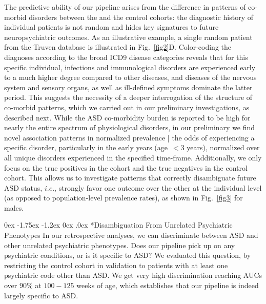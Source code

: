 \documentclass[onecolumn, compsoc,11pt]{IEEEtran}
\makeatletter
\renewcommand\subsection{\@startsection {subsection}{2}{\z@}%
                                   {0ex \@plus -1.75ex \@minus -1.2ex}%
                                   {0ex \@plus.0ex}%
                                   {\fontsize{11}{11}\selectfont\bfseries\sffamily\color{black}}}
\makeatother
\begin{document}
The predictive ability of our pipeline arises from the difference in patterns of co-morbid disorders between the \treatment and the control cohorts: the diagnostic history of individual patients is not random and hides key signatures to future neuropsychiatric outcomes. As an illustrative example, a single random patient from the Truven database is illustrated in Fig.~\ref{fig2}D.
Color-coding the diagnoses according to the broad ICD9 disease categories reveals that for this specific individual, infections and immunological disorders are experienced early to a much higher degree compared to other diseases, and diseases of the nervous system and sensory organs, as well as ill-defined symptoms dominate the latter period. This suggests the necessity of a deeper interrogation of the structure of co-morbid patterns, which we carried out in our preliminary investigations, as described next.
%
While the ASD co-morbidity burden  is reported to be high for nearly the entire spectrum of  physiological disorders, in our preliminary we find novel association patterns in normalized prevalence | the odds of experiencing a specific disorder, particularly in the early years (age~$<3$ years), normalized over all unique disorders experienced in the specified time-frame. Additionally, we only focus on  the true positives in the \treatment cohort and the true negatives in the control cohort. This  allows us to investigate  patterns that correctly disambiguate future ASD status, $i.e.$, strongly favor one outcome over the other at the individual level (as opposed to population-level prevalence rates), as shown in  Fig.~\ref{fig3} for males.

\subsection*{Disambiguation From Unrelated Psychiatric Phenotypes}
%
In our retrospective analyses,  we can discriminate between ASD and other unrelated psychiatric phenotypes. Does our pipeline pick up on any psychiatric conditions, or is it specific to ASD? We  evaluated this question, by restricting the  control  cohort in validation to  patients with at least one psychiatric code other than ASD. We get very high discrimination reaching AUCs over $90\%$ at $100-125$ weeks of age, which establishes that our pipeline is indeed largely specific to ASD.
\end{document}
